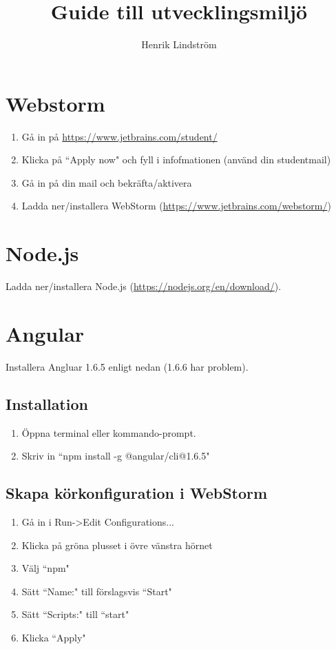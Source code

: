 \documentclass{article}
\title{Guide till utvecklingsmiljö}
\author{Henrik Lindström}
\begin{document}
\maketitle
\section{Webstorm}
\begin{enumerate}
\item Gå in på \url{https://www.jetbrains.com/student/}
\item Klicka på ``Apply now" och fyll i infofmationen (använd din studentmail)
\item Gå in på din mail och bekräfta/aktivera
\item Ladda ner/installera WebStorm (\url{https://www.jetbrains.com/webstorm/})
\end{enumerate}
\section{Node.js}
Ladda ner/installera Node.js (\url{https://nodejs.org/en/download/}).
\section{Angular}
Installera Angluar 1.6.5 enligt nedan (1.6.6 har problem).
\subsection{Installation}
\begin{enumerate}
\item Öppna terminal eller kommando-prompt.
\item Skriv in ``npm install -g @angular/cli@1.6.5"
\end{enumerate}
\subsection{Skapa körkonfiguration i WebStorm}
\begin{enumerate}
\item Gå in i Run-\textgreater Edit Configurations...
\item Klicka på gröna plusset i övre vänstra hörnet
\item Välj ``npm"
\item Sätt ``Name:" till förslagsvis ``Start"
\item Sätt ``Scripts:" till ``start"
\item Klicka ``Apply"
\end{enumerate}
\end{document}
